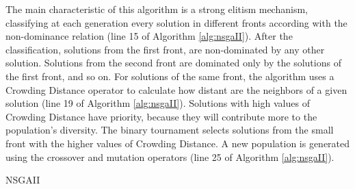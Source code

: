 \documentclass[conference]{IEEEtran}
\begin{document}
The main characteristic of this algorithm is a strong elitism mechanism, classifying at each generation every solution in different fronts according with the non-dominance relation (line 15 of Algorithm \ref{alg:nsgaII}). After the classification, solutions from the first front, are non-dominated by any other solution. Solutions from the second front are dominated only by the solutions of the first front, and so on. For solutions of the same front, the algorithm uses a Crowding Distance operator to calculate how distant are the neighbors of a given solution (line 19 of Algorithm \ref{alg:nsgaII}). Solutions with high values of Crowding Distance have priority, because they will contribute more to the population's diversity. The binary tournament selects solutions from the small front with the higher values of Crowding Distance. A new population is generated using the crossover and mutation operators (line 25 of Algorithm \ref{alg:nsgaII}).


\begin{algorithm}[ht]
	
	
	\caption{NSGAII}
	\label{alg:nsgaII}
\end{algorithm}
\end{document}
